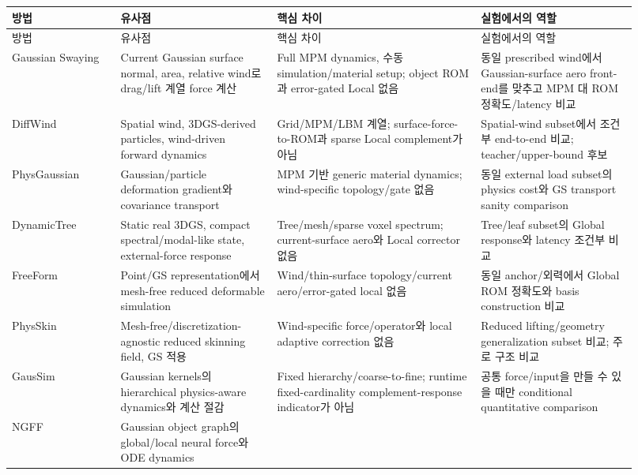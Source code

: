 \documentclass[11pt,a4paper]{article}
\begin{document}
\begin{longtable}{L{0.16\linewidth}L{0.23\linewidth}L{0.30\linewidth}L{0.23\linewidth}}
\toprule
방법 & 유사점 & 핵심 차이 & 실험에서의 역할 \\
\midrule
\endfirsthead
\toprule
방법 & 유사점 & 핵심 차이 & 실험에서의 역할 \\
\midrule
\endhead
Gaussian Swaying \cite{yan2026gaussianswaying}
& Current Gaussian surface normal, area, relative wind로 drag/lift 계열 force 계산
& Full MPM dynamics, 수동 simulation/material setup; object ROM과 error-gated Local 없음
& 동일 prescribed wind에서 Gaussian-surface aero front-end를 맞추고 MPM 대 ROM 정확도/latency 비교 \\
\addlinespace
DiffWind \cite{lei2026diffwind}
& Spatial wind, 3DGS-derived particles, wind-driven forward dynamics
& Grid/MPM/LBM 계열; surface-force-to-ROM과 sparse Local complement가 아님
& Spatial-wind subset에서 조건부 end-to-end 비교; teacher/upper-bound 후보 \\
\addlinespace
PhysGaussian \cite{xie2024physgaussian}
& Gaussian/particle deformation gradient와 covariance transport
& MPM 기반 generic material dynamics; wind-specific topology/gate 없음
& 동일 external load subset의 physics cost와 GS transport sanity comparison \\
\addlinespace
DynamicTree \cite{li2026dynamictree}
& Static real 3DGS, compact spectral/modal-like state, external-force response
& Tree/mesh/sparse voxel spectrum; current-surface aero와 Local corrector 없음
& Tree/leaf subset의 Global response와 latency 조건부 비교 \\
\addlinespace
FreeForm \cite{xiang2026freeform}
& Point/GS representation에서 mesh-free reduced deformable simulation
& Wind/thin-surface topology/current aero/error-gated local 없음
& 동일 anchor/외력에서 Global ROM 정확도와 basis construction 비교 \\
\addlinespace
PhysSkin \cite{lei2026physskin}
& Mesh-free/discretization-agnostic reduced skinning field, GS 적용
& Wind-specific force/operator와 local adaptive correction 없음
& Reduced lifting/geometry generalization subset 비교; 주로 구조 비교 \\
\addlinespace
GausSim \cite{shao2025gausim}
& Gaussian kernels의 hierarchical physics-aware dynamics와 계산 절감
& Fixed hierarchy/coarse-to-fine; runtime fixed-cardinality complement-response indicator가 아님
& 공통 force/input을 만들 수 있을 때만 conditional quantitative comparison \\
\addlinespace
NGFF \cite{li2026ngff}
& Gaussian object graph의 global/local neural force와 ODE dynamics

\end{longtable}
\end{document}
